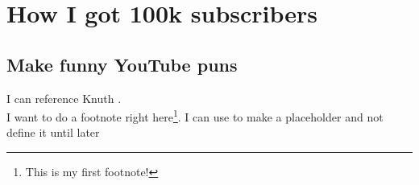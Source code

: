 \chapter{How I got 100k subscribers}

\section{Make funny YouTube puns}
I can reference Knuth \cite{knuth:1984}.\\

I want to do a footnote right here\footnote{This is my first footnote!}.
I can use \footnotemark to make a placeholder and not define it until later\footnotemark[\value{footnote}]

